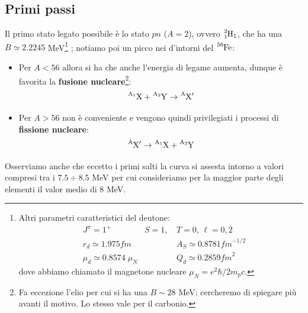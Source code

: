 \subsection{Primi passi} 
Il primo stato legato possibile è lo stato $pn$ ($A=2$), ovvero $\ce{^2_1H_1}$, che ha una $B\simeq 2.2245$ MeV\footnote{Altri parametri caratteristici del deutone:%
\begin{align*}%
    &J^\pi = 1^+ & S=1,\, &T= 0,\, \ell = 0,2 \\
    &r_d \simeq 1.975 \unit{fm} & &A_S \simeq 0.8781 \unit{fm}^{-1/2} \\
    &\mu_d \simeq 0.8574\;\mu_N & &Q_d \simeq 0.2859 \unit{fm}^2 
\end{align*}%
dove abbiamo chiamato il magnetone nucleare $\mu_N = e^2\hbar/2m_p c$.}%
; notiamo poi un picco nei d'intorni del $\ce{^56Fe}$:
\begin{itemize}
    \item Per $A<56$ allora si ha che  anche l'energia di legame aumenta, dunque è favorita la \textbf{fusione nucleare}\footnote{Fa eccezione l'elio per cui si ha una $B\sim 28$ MeV; cercheremo di spiegare più avanti il motivo. Lo stesso vale per il carbonio.}:
    $$\ce{^{A_1}X} + \ce{^{A_2}Y} \to \ce{^AX}'$$
    \item Per $A>56$  non è conveniente e vengono quindi privilegiati i processi di \textbf{fissione nucleare}:
    $$\ce{^AX}' \to \ce{^{A_1}X} + \ce{^{A_2}Y}$$
\end{itemize}
\noindent Osserviamo anche che eccetto i primi salti la curva si assesta intorno a valori compresi tra i $7.5 \div 8.5$ MeV per cui consideriamo per la maggior parte degli elementi il valor medio di 8 MeV.


